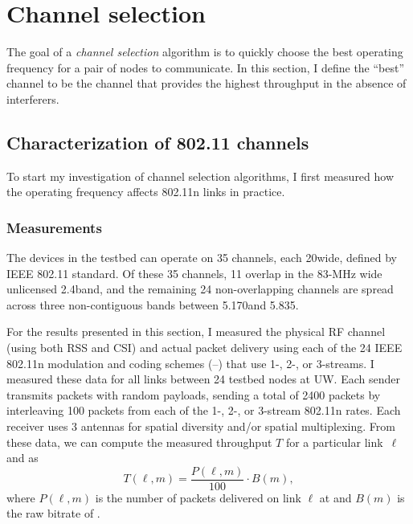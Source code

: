 \section{Channel selection}\label{sec:esnr_chansel}
The goal of a \emph{channel selection} algorithm is to quickly choose the best operating frequency for a pair of nodes to communicate. In this section, I define the ``best'' channel to be the channel that provides the highest throughput in the absence of interferers.

\subsection{Characterization of 802.11 channels}
To start my investigation of channel selection algorithms, I first measured how the operating frequency affects 802.11n links in practice.

\subsubsection{Measurements}
\label{sec:chan_sel_data}
The  devices in the testbed can operate on 35 channels, each 20\MHz wide, defined by IEEE 802.11 standard. Of these 35 channels, 11 overlap in the 83-MHz wide unlicensed 2.4\GHz band, and the remaining 24 non-overlapping channels are spread across three non-contiguous bands between 5.170\GHz and 5.835\GHz.

For the results presented in this section, I measured the physical RF channel (using both RSS and CSI) and actual packet delivery using each of the 24 IEEE 802.11n modulation and coding schemes (--) that use  1-, 2-, or 3-streams. I measured these data for all links between 24 testbed nodes at UW\@. Each sender transmits packets with random payloads, sending a total of 2400 packets by interleaving 100 packets from each of the 1-, 2-, or 3-stream 802.11n rates. Each receiver uses 3 antennas for spatial diversity and/or spatial multiplexing. From these data, we can compute the measured throughput $T$ for a particular link~$\ell$ and  as
\begin{equation}
	\label{eq:prr_throughput}
	T(\ell,m) = \frac{P(\ell,m)}{100} \cdot B(m),
\end{equation}
where $P(\ell,m)$ is the number of packets delivered on link $\ell$ at  and $B(m)$ is the raw bitrate of .

